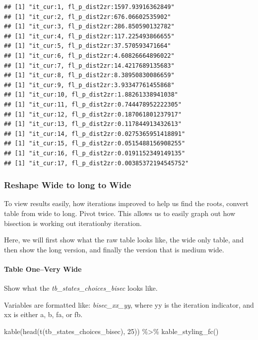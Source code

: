 \documentclass[
]{book}
\newenvironment{Shaded}{\begin{snugshade}}{\end{snugshade}}
\newcommand{\DecValTok}[1]{\textcolor[rgb]{0.00,0.00,0.81}{#1}}
\newcommand{\FunctionTok}[1]{\textcolor[rgb]{0.00,0.00,0.00}{#1}}
\newcommand{\NormalTok}[1]{#1}
\newcommand{\SpecialCharTok}[1]{\textcolor[rgb]{0.00,0.00,0.00}{#1}}
\begin{document}
\begin{verbatim}
## [1] "it_cur:1, fl_p_dist2zr:1597.93916362849"
## [1] "it_cur:2, fl_p_dist2zr:676.06602535902"
## [1] "it_cur:3, fl_p_dist2zr:286.850590132782"
## [1] "it_cur:4, fl_p_dist2zr:117.225493866655"
## [1] "it_cur:5, fl_p_dist2zr:37.570593471664"
## [1] "it_cur:6, fl_p_dist2zr:4.60826664896022"
## [1] "it_cur:7, fl_p_dist2zr:14.4217689135683"
## [1] "it_cur:8, fl_p_dist2zr:8.38950830086659"
## [1] "it_cur:9, fl_p_dist2zr:3.93347761455868"
## [1] "it_cur:10, fl_p_dist2zr:1.88261338941038"
## [1] "it_cur:11, fl_p_dist2zr:0.744478952222305"
## [1] "it_cur:12, fl_p_dist2zr:0.187061801237917"
## [1] "it_cur:13, fl_p_dist2zr:0.117844913432613"
## [1] "it_cur:14, fl_p_dist2zr:0.0275365951418891"
## [1] "it_cur:15, fl_p_dist2zr:0.0515488156908255"
## [1] "it_cur:16, fl_p_dist2zr:0.0191152349149135"
## [1] "it_cur:17, fl_p_dist2zr:0.00385372194545752"
\end{verbatim}

\hypertarget{reshape-wide-to-long-to-wide}{%
\subsubsection{Reshape Wide to long to Wide}\label{reshape-wide-to-long-to-wide}}

To view results easily, how iterations improved to help us find the roots, convert table from wide to long. Pivot twice. This allows us to easily graph out how bisection is working out iterationby iteration.

Here, we will first show what the raw table looks like, the wide only table, and then show the long version, and finally the version that is medium wide.

\hypertarget{table-onevery-wide}{%
\paragraph{Table One--Very Wide}\label{table-onevery-wide}}

Show what the \emph{tb\_states\_choices\_bisec} looks like.

Variables are formatted like: \emph{bisec\_xx\_yy}, where yy is the iteration indicator, and xx is either a, b, fa, or fb.

\begin{Shaded}
\begin{Highlighting}[]
\FunctionTok{kable}\NormalTok{(}\FunctionTok{head}\NormalTok{(}\FunctionTok{t}\NormalTok{(tb\_states\_choices\_bisec), }\DecValTok{25}\NormalTok{)) }\SpecialCharTok{\%\textgreater{}\%} 
  \FunctionTok{kable\_styling\_fc}\NormalTok{()}
\end{Highlighting}
\end{Shaded}
\end{document}
